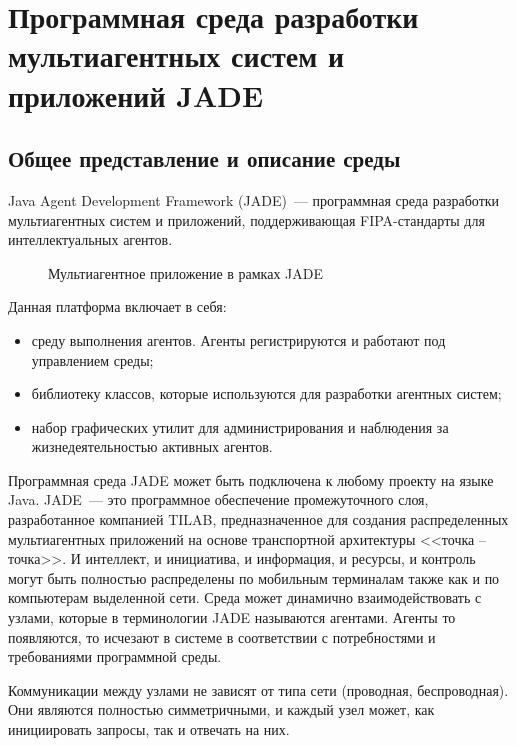 \section{Программная среда разработки мультиагентных систем и приложений JADE}
\subsection{Общее представление и описание среды}
Java Agent Development Framework (JADE)~--- программная среда разработки мультиагентных систем и приложений, поддерживающая FIPA-стандарты для интеллектуальных агентов.
\begin{figure}[h]
\caption{Мультиагентное приложение в рамках JADE}
\label{1:tanenbaum-agent}
\end{figure}

Данная платформа включает в себя:
\begin{itemize}
\item среду выполнения агентов. Агенты регистрируются и работают под управлением среды;
\item библиотеку классов, которые используются для разработки агентных систем;
\item набор графических утилит для администрирования и наблюдения за жизнедеятельностью активных агентов.
\end{itemize}

Программная среда JADE может быть подключена к любому проекту на языке Java.
JADE~--- это программное обеспечение промежуточного слоя, разработанное компанией TILAB, предназначенное для создания распределенных мультиагентных приложений на основе транспортной архитектуры <<точка -- точка>>. И интеллект, и инициатива, и информация, и ресурсы, и контроль могут быть полностью распределены по мобильным терминалам также как и по компьютерам выделенной сети. Среда может динамично взаимодействовать с узлами, которые в терминологии JADE называются агентами. Агенты то появляются, то исчезают в системе в соответствии с потребностями и требованиями программной среды.

Коммуникации между узлами не зависят от типа сети (проводная, беспроводная). Они являются полностью симметричными, и каждый узел может, как инициировать запросы, так и отвечать на них.

